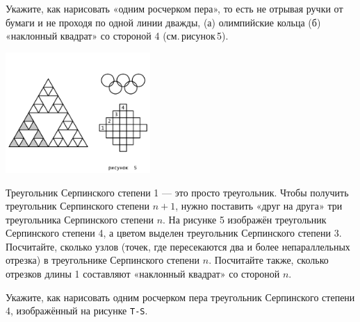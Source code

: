 ﻿

\begin{enumerate}
\itA Укажите, как нарисовать «одним росчерком пера», то есть не отрывая ручки от бумаги и не проходя по одной линии дважды, (а) олимпийские кольца (б) «наклонный квадрат» со стороной 4 (см.\,рисунок\,5).

\centerline{\includegraphics[width=5.5cm]{stats/2018/images/serpinsky}}

\itB Треугольник Серпинского степени 1 — это просто треугольник. Чтобы получить треугольник Серпинского степени $n+1$, нужно поставить «друг на друга» три треугольника Серпинского степени $n$. На рисунке 5 изображён треугольник Серпинского степени 4, а цветом выделен треугольник Серпинского степени 3. Посчитайте, сколько узлов (точек, где пересекаются два и более непараллельных отрезка) в треугольнике Серпинского степени $n$. Посчитайте также, сколько отрезков длины 1 составляют «наклонный квадрат» со стороной $n$.

\itC Укажите, как нарисовать одним росчерком пера треугольник Серпинского степени 4, изображённый на рисунке \texttt{T-S}.
\end{enumerate}